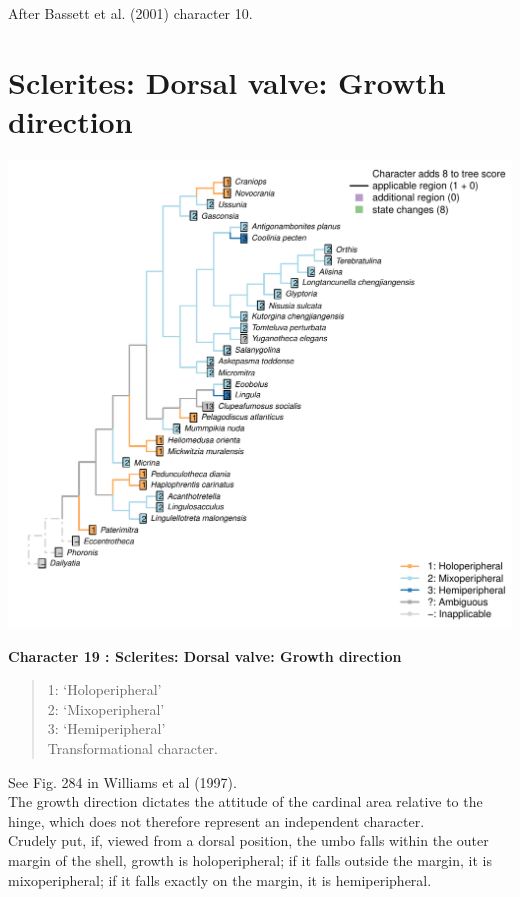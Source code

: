\documentclass[]{book}
\theoremstyle{definition}
\theoremstyle{definition}
\theoremstyle{definition}
\theoremstyle{remark}
\begin{document}
After Bassett et al. (2001) character 10.

\hypertarget{sclerites-dorsal-valve-growth-direction}{%
\section*{Sclerites: Dorsal valve: Growth
direction}\label{sclerites-dorsal-valve-growth-direction}}

\includegraphics{Brachiopod_phylogeny_files/figure-latex/unnamed-chunk-5-19.pdf}

\textbf{Character 19 : Sclerites: Dorsal valve: Growth direction }

\begin{quote}
1: `Holoperipheral'\\
2: `Mixoperipheral'\\
3: `Hemiperipheral'\\
Transformational character.
\end{quote}

See Fig. 284 in Williams et al (1997).\\
The growth direction dictates the attitude of the cardinal area relative
to the hinge, which does not therefore represent an independent
character.\\
Crudely put, if, viewed from a dorsal position, the umbo falls within
the outer margin of the shell, growth is holoperipheral; if it falls
outside the margin, it is mixoperipheral; if it falls exactly on the
margin, it is hemiperipheral.
\end{document}
